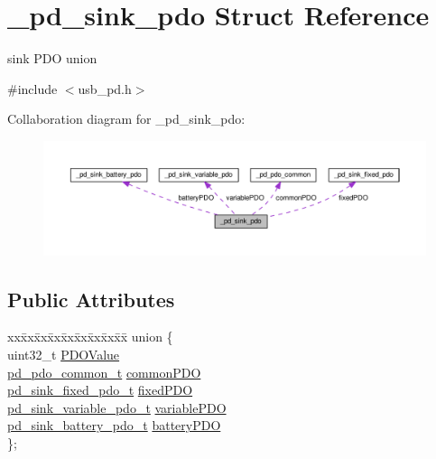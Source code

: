 \hypertarget{struct__pd__sink__pdo}{\section{\-\_\-pd\-\_\-sink\-\_\-pdo Struct Reference}
\label{struct__pd__sink__pdo}
}


sink P\-D\-O union  




{\ttfamily \#include $<$usb\-\_\-pd.\-h$>$}



Collaboration diagram for \-\_\-pd\-\_\-sink\-\_\-pdo\-:
\nopagebreak
\begin{figure}[H]
\begin{center}
\leavevmode
\includegraphics[width=350pt]{struct__pd__sink__pdo__coll__graph}
\end{center}
\end{figure}
\subsection*{Public Attributes}
\begin{DoxyCompactItemize}
\item 
\begin{tabbing}
xx\=xx\=xx\=xx\=xx\=xx\=xx\=xx\=xx\=\kill
union \{\\
\>uint32\_t \hyperlink{struct__pd__sink__pdo_a2f3c5aa6d559d35227af11db28c5dac8}{PDOValue}\\
\>\hyperlink{group__usb__pd__stack_ga7b2f5a42b9f5ae0e5b76f2ed44482ff3}{pd\_pdo\_common\_t} \hyperlink{struct__pd__sink__pdo_a8f6789929499a63a1326708206e016c5}{commonPDO}\\
\>\hyperlink{group__usb__pd__stack_gac1092e8fe40315ed926966b5b17883aa}{pd\_sink\_fixed\_pdo\_t} \hyperlink{struct__pd__sink__pdo_aebd2d1f5078757ee9a4c3d836e0df136}{fixedPDO}\\
\>\hyperlink{group__usb__pd__stack_gaf18073722dd91e4b87b60a6db76dc8dc}{pd\_sink\_variable\_pdo\_t} \hyperlink{struct__pd__sink__pdo_a15603e339ec84b653f83ee6865c1dfd8}{variablePDO}\\
\>\hyperlink{group__usb__pd__stack_ga917a58335ea75ba8b8cc3c359e1dee7a}{pd\_sink\_battery\_pdo\_t} \hyperlink{struct__pd__sink__pdo_adb7ddc7d4451cd6fe0f6eb13ebce229e}{batteryPDO}\\
\}; \\

\end{tabbing}\end{DoxyCompactItemize}


